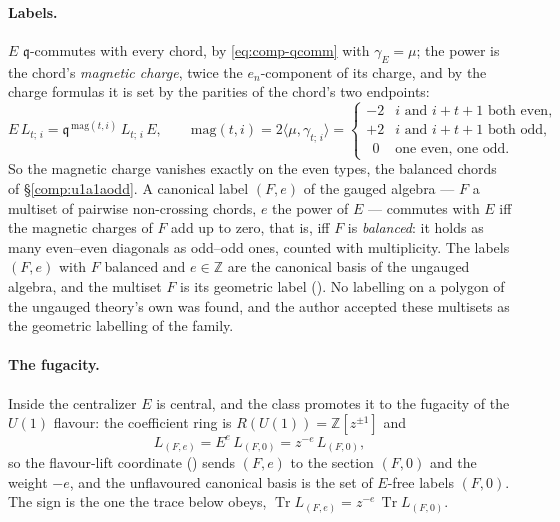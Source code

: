 \documentclass[11pt]{amsart}
\DeclareMathOperator{\Tr}{Tr}
\newcommand\fq{\mathfrak{q}}
\newcommand\bZ{\mathbb{Z}}
\theoremstyle{remark}
\begin{document}
\paragraph{Labels.}  $E$ $\fq$-commutes with every chord, by
\eqref{eq:comp-qcomm} with $\gamma_E=\mu$; the power is the chord's
\emph{magnetic charge}, twice the $e_n$-component of its charge, and by the
charge formulas it is set by the parities of the chord's two endpoints:
\begin{equation}\label{eq:comp-aodd-mag}
  E\,L_{t;\,i}=\fq^{\,\mathrm{mag}(t,i)}\,L_{t;\,i}\,E,\qquad
  \mathrm{mag}(t,i)=2\langle\mu,\gamma_{t;\,i}\rangle=
  \begin{cases}
    -2 & i\text{ and }i+t+1\text{ both even},\\
    +2 & i\text{ and }i+t+1\text{ both odd},\\
    \ \ 0 & \text{one even, one odd}.
  \end{cases}
\end{equation}
So the magnetic charge vanishes exactly on the even types, the balanced
chords of \S\ref{comp:u1a1aodd}.  A canonical label $(F,e)$ of the gauged
algebra --- $F$ a multiset of pairwise non-crossing chords, $e$ the power of
$E$ --- commutes with $E$ iff the magnetic charges of $F$ add up to zero, that
is, iff $F$ is \emph{balanced}: it holds as many even--even diagonals as
odd--odd ones, counted with multiplicity.  The labels $(F,e)$ with $F$
balanced and $e\in\bZ$ are the canonical basis of the ungauged algebra, and
the multiset $F$ is its geometric label ().  No labelling
on a polygon of the ungauged theory's own was found, and the author accepted
these multisets as the geometric labelling of the family.

\paragraph{The fugacity.}  Inside the centralizer $E$ is central, and the
class promotes it to the fugacity of the $U(1)$ flavour: the coefficient ring
is $R(U(1))=\bZ[z^{\pm1}]$ and
\begin{equation}\label{eq:comp-aodd-lift}
  L_{(F,e)}=E^{e}\,L_{(F,0)}=z^{-e}\,L_{(F,0)},
\end{equation}
so the flavour-lift coordinate () sends $(F,e)$ to the
section $(F,0)$ and the weight $-e$, and the unflavoured canonical basis is the
set of $E$-free labels $(F,0)$.  The sign is the one the trace below obeys,
$\Tr L_{(F,e)}=z^{-e}\,\Tr L_{(F,0)}$.
\end{document}
